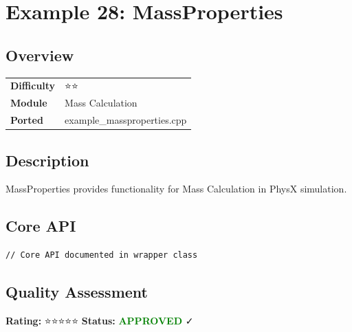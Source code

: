 \section{Example 28: MassProperties}
\subsection{Overview}
\begin{table}[h]
\centering
\begin{tabular}{|l|l|}
\hline
\textbf{Difficulty} & ⭐⭐ \\
\textbf{Module} & Mass Calculation \\
\textbf{Ported} & example\_massproperties.cpp \\
\hline
\end{tabular}
\end{table}

\subsection{Description}
MassProperties provides functionality for Mass Calculation in PhysX simulation.

\subsection{Core API}
\begin{lstlisting}
// Core API documented in wrapper class
\end{lstlisting}

\subsection{Quality Assessment}
\textbf{Rating:} ⭐⭐⭐⭐⭐ \quad \textbf{Status:} \textcolor{green}{\textbf{APPROVED}} ✓
